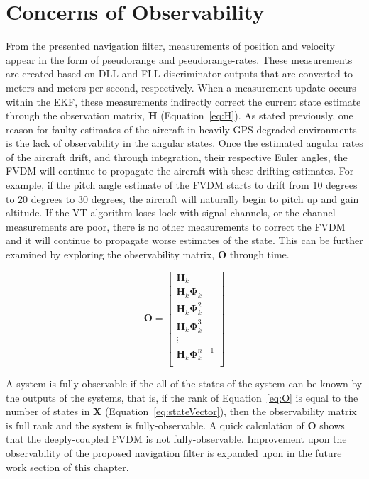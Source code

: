 \section{\textbf{Concerns of Observability}}

From the presented navigation filter, measurements of position and velocity appear in the form of pseudorange and pseudorange-rates. These measurements are created based on DLL and FLL discriminator outputs that are converted to meters and meters per second, respectively. When a measurement update occurs within the EKF, these measurements indirectly correct the current state estimate through the observation matrix, \(\mathbf{H}\) (Equation~\ref{eq:H}). As stated previously, one reason for faulty estimates of the aircraft in heavily GPS-degraded environments is the lack of observability in the angular states. Once the estimated angular rates of the aircraft drift, and through integration, their respective Euler angles, the FVDM will continue to propagate the aircraft with these drifting estimates. For example, if the pitch angle estimate of the FVDM starts to drift from 10 degrees to 20 degrees to 30 degrees, the aircraft will naturally begin to pitch up and gain altitude. If the VT algorithm loses lock with signal channels, or the channel measurements are poor, there is no other measurements to correct the FVDM and it will continue to propagate worse estimates of the state. This can be further examined by exploring the observability matrix, \(\mathbf{O}\) through time.

\begin{equation}\label{eq:O}
    \mathbf{O} = \begin{bmatrix}
        \mathbf{H}_k                    \\
        \mathbf{H}_k\mathbf{\Phi}_k       \\
        \mathbf{H}_k\mathbf{\Phi}_k^2     \\
        \mathbf{H}_k\mathbf{\Phi}_k^3     \\
        \vdots                        \\
        \mathbf{H}_k\mathbf{\Phi}_k^{n-1} \\
    \end{bmatrix}
\end{equation}

A system is fully-observable if the all of the states of the system can be known by the outputs of the systems, that is, if the rank of Equation~\ref{eq:O} is equal to the number of states in \(\mathbf{X}\) (Equation~\ref{eq:stateVector}), then the observability matrix is full rank and the system is fully-observable. A quick calculation of \(\mathbf{O}\) shows that the deeply-coupled FVDM is not fully-observable. Improvement upon the observability of the proposed navigation filter is expanded upon in the future work section of this chapter. 


